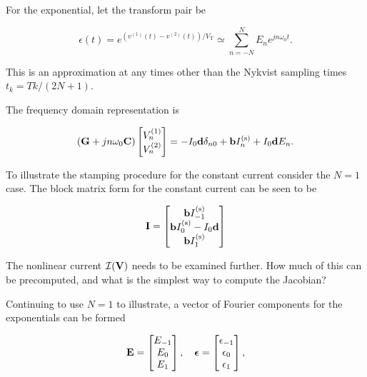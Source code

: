 For the exponential, let the transform pair be

\begin{equation}\label{eqn:ece1254projectReport:1300}
\epsilon(t) =
e^{ (v^{(1)}(t) - v^{(2)}(t))/V_{\textrm{T}}}
\simeq
\sum_{n=-N}^N E_n e^{ j n \omega_0 t }.
\end{equation}

This is an approximation at any times other than the Nykvist sampling times \( t_k = T k/(2 N + 1) \).

The frequency domain representation is

\begin{equation}\label{eqn:ece1254projectReport:820}
\lr{ \BG + j n \omega_0 \BC }
\begin{bmatrix}
V^{(1)}_n \\
V^{(2)}_n \\
\end{bmatrix}
=
-I_0 \Bd \delta_{n 0}
+
\Bb I^{(\textrm{s})}_n
+ I_0 \Bd E_n.
\end{equation}

To illustrate the stamping procedure for the constant current consider the \( N = 1 \) case.
The block matrix form for the constant current can be seen to be

\begin{equation}\label{eqn:ece1254projectReport:840}
\BI
=
\begin{bmatrix}
\Bb I^{(\textrm{s})}_{-1} \\
\Bb I^{(\textrm{s})}_{0} - I_0 \Bd \\
\Bb I^{(\textrm{s})}_{1} \\
\end{bmatrix}
\end{equation}

The nonlinear current \( \mathcal{I}(\mathbf{V}) \) needs to be examined further.
How much of this can be precomputed, and what is the simplest way to compute the Jacobian?

Continuing to use \( N = 1 \) to illustrate, a vector of Fourier components for the exponentials can be formed

\begin{equation}\label{eqn:ece1254projectReport:880}
\BE =
\begin{bmatrix}
E_{-1} \\
E_{0} \\
E_{1} \\
\end{bmatrix}, \quad
\Bepsilon =
\begin{bmatrix}
\epsilon_{-1} \\
\epsilon_{0} \\
\epsilon_{1} \\
\end{bmatrix},
\end{equation}

